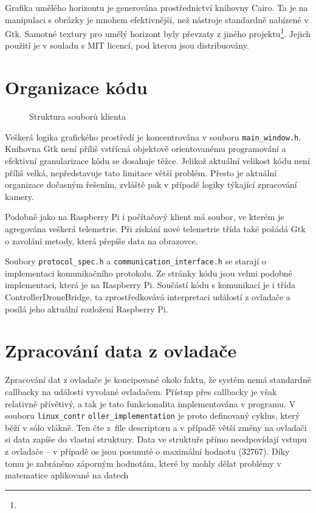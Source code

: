 \documentclass[a4paper,oneside,12pt]{report}
\begin{document}
Grafika umělého horizontu je generována prostřednictví knihovny Cairo.
Ta je na manipulaci s obrázky je mnohem efektivnější, než nástroje standardně nabízené v Gtk.
Samotné textury pro umělý horizont byly převzaty z jiného projektu\footnote{}.
Jejich použití je v souladu s MIT licencí, pod kterou jsou distribuovány.

\section{Organizace kódu}

\begin{figure}[h]
  \caption[Struktura souborů klienta]{Struktura souborů klienta}
\end{figure}

Veškerá logika grafického prostředí je koncentrována v souboru \verb|main_window.h|.
Knihovna Gtk není příliš vstřícná objektově orientovanému programování a efektivní granularizace kódu se dosahuje těžce.
Jelikož aktuální velikost kódu není příliš velká, nepředstavuje tato limitace větší problém.
Přesto je aktuální organizace dočasným řešením, zvláště pak v případě logiky týkající zpracování kamery.

Podobně jako na Raspberry Pi i počítačový klient má soubor, ve kterém je agregována veškerá telemetrie.
Při získání nové telemetrie třída také požádá Gtk o zavolání metody, která přepíše data na obrazovce.

Soubory \verb|protocol_spec.h| a \verb|communication_interface.h| se starají o implementaci komunikačního protokolu.
Ze stránky kódu jsou velmi podobné implementaci, která je na Raspberry Pi.
Součástí kódu s komunikací je i třída ControllerDroneBridge, ta zprostředkovává interpretaci událostí z ovladače a posílá jeho aktuální rozložení Raspberry Pi.

\section{Zpracování data z ovladače}

Zpracování dat z ovladače je koncipované okolo faktu, že systém nemá standardně callbacky na události vyvolané ovladačem.
Přístup přes callbacky je však relativně přívětivý, a tak je tato funkcionalita implementována v programu.
V souboru \verb|linux_contr|
\verb|oller_implementation| je proto definovaný cyklus, který běží v sólo vlákně.
Ten čte z~file descriptoru a v případě větší změny na ovladači si data zapíše do vlastní struktury.
Data ve struktuře přímo neodpovídají vstupu z ovladače -- v případě os jsou posunuté o maximální hodnotu (32767).
Díky tomu je zabráněno záporným hodnotám, které by mohly dělat problémy v matematice aplikované na datech
\end{document}
